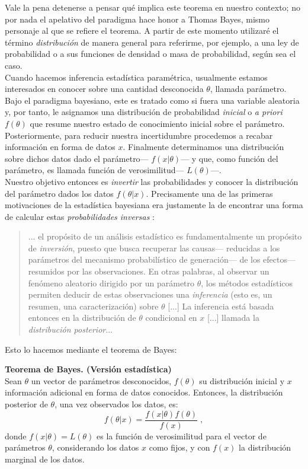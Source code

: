 Vale la pena detenerse a pensar qué implica este teorema en nuestro contexto; no por nada el apelativo del paradigma hace honor a Thomas Bayes, mismo personaje al que se refiere el teorema. A partir de este momento utilizaré el término \textit{distribución} de manera general para referirme, por ejemplo, a una ley de probabilidad o a sus funciones de densidad o masa de probabilidad, según sea el caso.\\ 

Cuando hacemos inferencia estadística paramétrica, usualmente estamos interesados en conocer sobre una cantidad desconocida $\theta$, llamada parámetro. Bajo el paradigma bayesiano, este es tratado como si fuera una variable aleatoria y, por tanto, le asignamos una  distribución de probabilidad \textit{inicial} o \textit{a priori} $f(\theta)$ que resume nuestro estado de conocimiento inicial sobre el parámetro. Posteriormente, para reducir nuestra incertidumbre procedemos a recabar información en forma de datos $x$. Finalmente determinamos una distribución sobre dichos datos dado el parámetro--- $f(x|\theta)$--- y que, como función del parámetro, es llamada función de verosimilitud--- $L(\theta)$---.\\ 

Nuestro objetivo entonces es \textit{invertir} las probabilidades y conocer la distribución del parámetro dados los datos $f(\theta|x)$. Precisamente una de las primeras motivaciones de la estadística bayesiana era justamente la de encontrar una forma de calcular estas \textit{probabilidades inversas} \citep{Robert07}: 
\begin{quote}
... el propósito de un análisis estadístico es fundamentalmente un propósito de \textit{inversión}, puesto que busca recuperar las causas--- reducidas a los parámetros del mecanismo probabilístico de generación--- de los efectos--- resumidos por las observaciones. En otras palabras, al observar un fenómeno aleatorio dirigido por un parámetro $\theta$, los métodos estadísticos permiten deducir de estas observaciones una \textit{inferencia} (esto es, un resumen, una caracterización) sobre $\theta$ [...] La inferencia está basada entonces en la distribución de $\theta$ condicional en $x$ [...] llamada la \textit{distribución posterior}...
\end{quote} 

Esto lo hacemos mediante el teorema de Bayes: 

\begin{teo} \label{teo:Bayes_2}
\textbf{Teorema de Bayes. (Versión estadística)}\\
Sean $\theta$ un vector de parámetros desconocidos, $f(\theta)$ su distribución inicial y $x$ información adicional en forma de datos conocidos. Entonces, la distribución posterior de $\theta$, una vez observados los datos, es: 
\begin{equation*}
f(\theta|x)=\dfrac{f(x|\theta)f(\theta)}{f(x)}\;,
\end{equation*}
donde $f(x|\theta) = L(\theta)$ es la función de verosimilitud para el vector de parámetros $\theta$, considerando los datos $x$ como fijos, y con $f(x)$ la distribución marginal de los datos. 
\end{teo}

